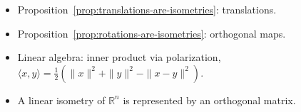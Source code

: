 \begin{remark*}[Dependencies]
\begin{itemize}
  \item Proposition~\ref{prop:translations-are-isometries}: translations.
  \item Proposition~\ref{prop:rotations-are-isometries}: orthogonal maps.
  \item Linear algebra: inner product via polarization,
        $\langle x,y \rangle = \tfrac{1}{2}(\|x\|^2 + \|y\|^2 - \|x-y\|^2)$.
  \item A linear isometry of $\mathbb{R}^n$ is represented by an orthogonal matrix.
\end{itemize}
\end{remark*}
